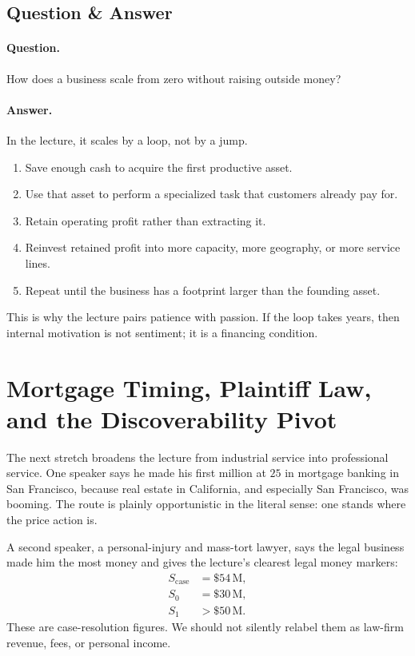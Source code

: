 \subsection{Question \& Answer}

\paragraph{Question.} How does a business scale from zero without raising outside money?

\paragraph{Answer.} In the lecture, it scales by a loop, not by a jump.

\begin{enumerate}
\item Save enough cash to acquire the first productive asset.
\item Use that asset to perform a specialized task that customers already pay for.
\item Retain operating profit rather than extracting it.
\item Reinvest retained profit into more capacity, more geography, or more service lines.
\item Repeat until the business has a footprint larger than the founding asset.
\end{enumerate}

This is why the lecture pairs patience with passion. If the loop takes years, then internal motivation is not sentiment; it is a financing condition.

\section{Mortgage Timing, Plaintiff Law, and the Discoverability Pivot}

The next stretch broadens the lecture from industrial service into professional service. One speaker says he made his first million at \(25\) in mortgage banking in San Francisco, because real estate in California, and especially San Francisco, was booming. The route is plainly opportunistic in the literal sense: one stands where the price action is.

A second speaker, a personal-injury and mass-tort lawyer, says the legal business made him the most money and gives the lecture's clearest legal money markers:
\begin{align}
S_{\mathrm{case}} &= \$54\,\mathrm{M},\\
S_0 &= \$30\,\mathrm{M},\\
S_1 &> \$50\,\mathrm{M}.
\end{align}
These are case-resolution figures. We should not silently relabel them as law-firm revenue, fees, or personal income.

